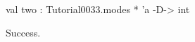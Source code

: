 \chklistingtrue
{}
\begin{ChkListingMsg}
val two : Tutorial0033.modes * 'a -D-> int
\end{ChkListingMsg}
\begin{ChkListingErr}
Success.
\end{ChkListingErr}
